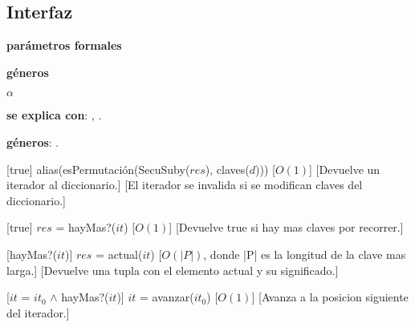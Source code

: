 \begin{Interfaz}
\subsection{Interfaz}

  \textbf{par\'ametros formales}\parindent\\
  \parbox{1.7cm}{\textbf{g\'eneros}} $\alpha$
 
 
  \textbf{se explica con}: , .

  \textbf{g\'eneros}: .


%
[true]
{alias(esPermutaci\'on(SecuSuby($res$), claves($d$)))}%
[$O(1)$] %
[Devuelve un iterador al diccionario.]
[El iterador se invalida si se modifican claves del diccionario.]

%
[true]
{$res$ = hayMas?($it$)}%
[$O(1)$]
[Devuelve true si hay mas claves por recorrer.]

%
[hayMas?($it$)]
{$res$ = actual($it$)}%
[$O(|P|)$, donde |P| es la longitud de la clave mas larga.]
[Devuelve una tupla con el elemento actual y su significado.]

%
[$it$ = $it_0$ $\land$ hayMas?($it$)]
{$it$ = avanzar($it_0$)}%
[$O(1)$]
[Avanza a la posicion siguiente del iterador.]



\end{Interfaz}



